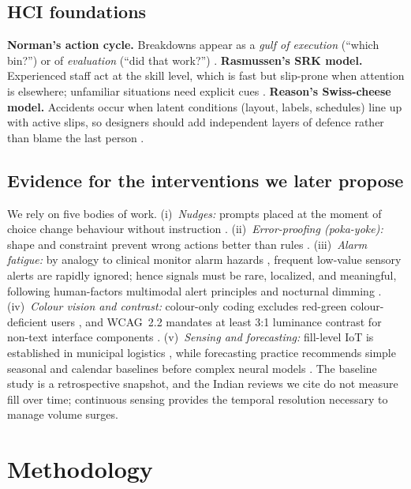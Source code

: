 \documentclass[10pt,twocolumn,a4paper]{article}
\begin{document}
\subsection{HCI foundations}
\textbf{Norman's action cycle.} Breakdowns appear as a \emph{gulf of execution} (``which bin?'') or of \emph{evaluation} (``did that work?'') \cite{norman1986,norman2013}. \textbf{Rasmussen's SRK model.} Experienced staff act at the skill level, which is fast but slip-prone when attention is elsewhere; unfamiliar situations need explicit cues \cite{rasmussen1983}. \textbf{Reason's Swiss-cheese model.} Accidents occur when latent conditions (layout, labels, schedules) line up with active slips, so designers should add independent layers of defence rather than blame the last person \cite{reason1990,reason2000}.

\subsection{Evidence for the interventions we later propose}
We rely on five bodies of work. (i)~\emph{Nudges:} prompts placed at the moment of choice change behaviour without instruction \cite{thaler2008}. (ii)~\emph{Error-proofing (poka-yoke):} shape and constraint prevent wrong actions better than rules \cite{shingo1986}. (iii)~\emph{Alarm fatigue:} by analogy to clinical monitor alarm hazards \cite{sendelbach2013}, frequent low-value sensory alerts are rapidly ignored; hence signals must be rare, localized, and meaningful, following human-factors multimodal alert principles and nocturnal dimming \cite{wickens2013}. (iv)~\emph{Colour vision and contrast:} colour-only coding excludes red-green colour-deficient users \cite{birch2012}, and WCAG~2.2 mandates at least 3:1 luminance contrast for non-text interface components \cite{wcag2023}. (v)~\emph{Sensing and forecasting:} fill-level IoT is established in municipal logistics \cite{medvedev2015}, while forecasting practice recommends simple seasonal and calendar baselines before complex neural models \cite{hyndman2021}. The baseline study is a retrospective snapshot, and the Indian reviews we cite \cite{datta2018,capoor2017} do not measure fill over time; continuous sensing provides the temporal resolution necessary to manage volume surges.

\section{Methodology}
\end{document}
